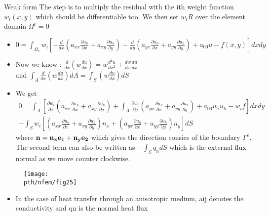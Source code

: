 	\begin{frame}{Weak form}
		The step is to multiply the residual with the ith weight function $w_i(x,y)$ which should be differentiable too. We then set $w_iR$ over the element domain $\Omega^e = 0$
		\begin{itemize}
			\item $0 = \int_{\Omega_e} w_i \left[ 
			-\frac{d}{dx}\left(a_{xx} \frac{\partial u_h}{\partial x} + a_{xy} \frac{\partial u_h}{\partial y} \right)
			-\frac{d}{dy}\left(a_{yx} \frac{\partial u_h}{\partial x} + a_{yy} \frac{\partial u_h}{\partial y} \right) + a_{00} u - f(x,y) \right] dxdy$
			\item Now we know : $\frac{d}{dx}\left(w \frac{du}{dx}\right) = w\frac{d^2u}{dx^2} + \frac{dw}{dx}\frac{du}{dx}$ \\ and $\int_A \frac{d}{dx}\left(w \frac{du}{dx} \right) dA= \int_S \left(w \frac{du}{dx} \right) dS$
			\item We get 
			\begin{equation}
			\begin{aligned}
			0 = \int_A \left[\frac{\partial w_i}{\partial x} \left(a_{xx} \frac{\partial u_h}{\partial x } + a_{xy} \frac{\partial u_h}{\partial y }\right) + 
			\int_A \frac{\partial w_i}{\partial y} \left(a_{yx} \frac{\partial u_h}{\partial x } + a_{yy} \frac{\partial u_h}{\partial y }\right) + a_{00}w_iu_h - w_if \right]dxdy \\
			- \int_S w_i \left[ \left(a_{xx} \frac{\partial u_h}{\partial x} + a_{xy} \frac{\partial u_h}{\partial y} \right)n_x + \left(a_{yx} \frac{\partial u_h}{\partial x} + a_{yy} \frac{\partial u_h}{\partial y} \right)n_y \right]dS
			\end{aligned}
			\end{equation}
			where $\mathbf{n = n_xe_1 + n_ye_2}$ which gives the direction consies of the boundary $\Gamma^e$. The second term can also be written as $-\int_S q_n dS$ which is the external flux normal as we move counter clockwise. 
		\end{itemize}
	\end{frame}


	\begin{frame}
		\begin{figure}
			\centering
			\texttt{[image: \\pth/nfem/fig25]} 		
		\end{figure}
	\begin{itemize}
		\item In the case of heat transfer through an anisotropic medium, aij denotes the conductivity and qn is the normal heat flux
		
	\end{itemize}
	\end{frame}


